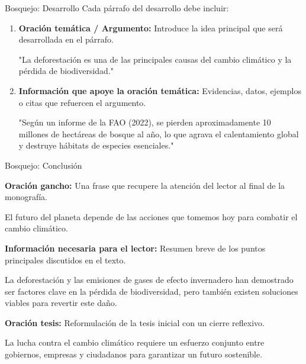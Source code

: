 \documentclass[
11pt, %
]{beamer}
\begin{document}
\begin{frame}{Bosquejo: Desarrollo}
	Cada párrafo del desarrollo debe incluir:

	\begin{enumerate}
		\item \textbf{Oración temática / Argumento:} Introduce la idea principal que será desarrollada en el párrafo.
		      \begin{block}{}
			      "La deforestación es una de las principales causas del cambio climático y la pérdida de biodiversidad."
		      \end{block}

		\item \textbf{Información que apoye la oración temática:} Evidencias, datos, ejemplos o citas que refuercen el argumento.
		      \begin{block}{}
			      "Según un informe de la FAO (2022), se pierden aproximadamente 10 millones de hectáreas de bosque al año, lo que agrava el calentamiento global y destruye hábitats de especies esenciales."
		      \end{block}
	\end{enumerate}
\end{frame}

\begin{frame}{Bosquejo: Conclusión}

	\textbf{Oración gancho:} Una frase que recupere la atención del lector al final de la monografía.
	\begin{block}{}
		El futuro del planeta depende de las acciones que tomemos hoy para combatir el cambio climático.
	\end{block}

	\textbf{Información necesaria para el lector:} Resumen breve de los puntos principales discutidos en el texto.
	\begin{block}{}
		La deforestación y las emisiones de gases de efecto invernadero han demostrado ser factores clave en la pérdida de biodiversidad, pero también existen soluciones viables para revertir este daño.
	\end{block}

	\textbf{Oración tesis:} Reformulación de la tesis inicial con un cierre reflexivo.
	\begin{block}{}
		La lucha contra el cambio climático requiere un esfuerzo conjunto entre gobiernos, empresas y ciudadanos para garantizar un futuro sostenible.
	\end{block}
\end{frame}
\end{document}
